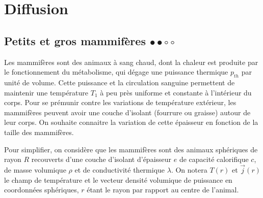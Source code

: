 \chapter{Diffusion}

\newpage

\section{Petits et gros mammifères $\bullet\bullet\circ\circ$}

Les mammifères sont des animaux à sang chaud, dont la chaleur est produite par le fonctionnement du métabolisme, qui dégage une puissance thermique $p_{th}$ par unité de volume. Cette puissance et la circulation sanguine permettent de maintenir une température $T_1$ à peu près uniforme et constante à l'intérieur du corps. Pour se prémunir contre les variations de température extérieur, les mammifères peuvent avoir une couche d'isolant (fourrure ou graisse) autour de leur corps. On souhaite connaitre la variation de cette épaisseur en fonction de la taille des mammifères. 

Pour simplifier, on considère que les mammifères sont des animaux sphériques de rayon $R$ recouverts d'une couche d'isolant d'épaisseur $e$ de capacité calorifique $c$, de masse volumique $\rho$ et de conductivité thermique $\lambda$. On notera $T(r)$ et $\vec{j}(r)$ le champ de température et le vecteur densité volumique de puissance en coordonnées sphériques, $r$ étant le rayon par rapport au centre de l'animal.

